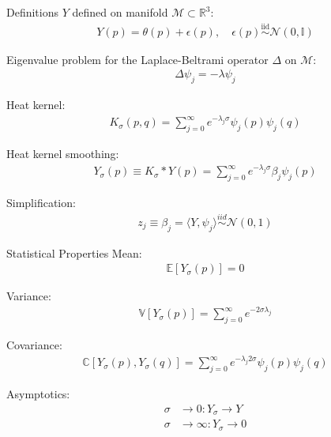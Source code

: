 \documentclass[8pt]{beamer}
\begin{document}
\begin{frame}{Definitions}
$Y$ defined on manifold $\mathcal{M} \subset \mathbb{R}^3$:
\begin{align}
    Y(p) = \theta(p) + \epsilon(p), \quad \epsilon(p) \overset{\text{iid}}{\sim} \mathcal{N}(0, \mathbb{I})
\end{align}

Eigenvalue problem for the Laplace-Beltrami operator $\Delta$ on $\mathcal{M}$:
\begin{align}
    \Delta \psi_j = -\lambda \psi_j
\end{align}

Heat kernel:
\begin{align}
    K_{\sigma}(p, q) = \sum_{j=0}^\infty e^{-\lambda_j\sigma} \psi_j(p) \psi_j(q)
\end{align}

Heat kernel smoothing:
\begin{align}
    Y_\sigma(p) \equiv K_{\sigma}  \ast Y(p) = \sum_{j=0}^\infty e^{-\lambda_j \sigma} \beta_j \psi_j(p)
\end{align}


Simplification:
\begin{align}
    z_j \equiv \beta_j = \langle Y, \psi_j \rangle \overset{iid}{\sim} \mathcal{N}(0, 1)
\end{align}

\citep{seo_heat_2010}
\end{frame}

\begin{frame}{Statistical Properties}
Mean:
\begin{align}
    \mathbb{E}[Y_\sigma(p)] = 0
\end{align}

Variance:
\begin{align}
    \mathbb{V}[Y_\sigma(p)] = \sum_{j=0}^\infty e^{-2\sigma\lambda_j}
\end{align}

Covariance:
\begin{align}
    \mathbb{C}[Y_\sigma(p), Y_\sigma(q)] = \sum_{j=0}^\infty e^{-\lambda_j 2\sigma} \psi_j(p) \psi_j(q)
\end{align}

Asymptotics:
\begin{align}
    \sigma&\to 0: Y_\sigma \to Y\\
    \sigma &\to \infty: Y_\sigma \to 0
\end{align}

\citep{kushnarev_heat_2019}
\end{frame}
\end{document}
